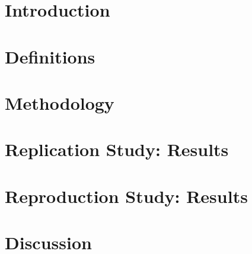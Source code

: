 \minitoc


\section{Introduction}
\label{sec:buildability:intro}


% 

\section{Definitions}
\label{sec:buildability:definitions}


\section{Methodology}
\label{sec:buildability:metodology}


\section{Replication Study: Results}
\label{sec:buildability:results-repli}


\section{Reproduction Study: Results}
\label{sec:buildability:results-repro}
 

\section{Discussion}
\label{sec:buildability:discussion}


